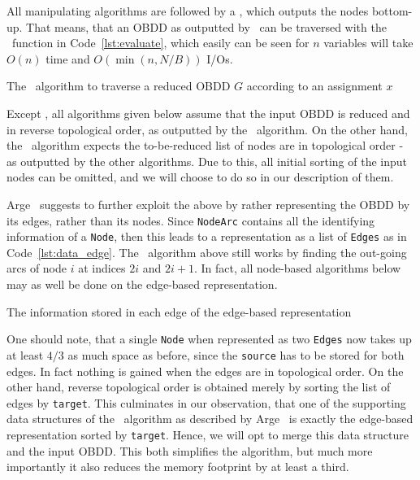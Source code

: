 All manipulating algorithms are followed by a \Reduce, which outputs the nodes
bottom-up. That means, that an OBDD as outputted by \Reduce\ can be traversed
with the \Evaluate\ function in Code~\ref{lst:evaluate}, which easily can be
seen for $n$ variables will take $O(n)$ time and $O(\min(n, N/B))$ I/Os.
\begin{lstfloat}[ht!]
  \centering

  

  \caption{The \Evaluate\ algorithm to traverse a reduced OBDD $G$ according to an
    assignment $x$}
  \label{lst:evaluate}
\end{lstfloat}

Except \Reduce, all algorithms given below assume that the input OBDD is reduced
and in reverse topological order, as outputted by the \Reduce\ algorithm. On the
other hand, the \Reduce\ algorithm expects the to-be-reduced list of nodes are
in topological order - as outputted by the other algorithms. Due to this, all
initial sorting of the input nodes can be omitted, and we will choose to do so
in our description of them. \cite{Arge96}

Arge~\cite{Arge96} suggests to further exploit the above by rather representing
the OBDD by its edges, rather than its nodes. Since \lstinline{NodeArc} contains
all the identifying information of a \lstinline{Node}, then this leads to a
representation as a list of \lstinline{Edges} as in Code~\ref{lst:data_edge}.
The \Evaluate\ algorithm above still works by finding the out-going arcs of node
$i$ at indices $2i$ and $2i+1$. In fact, all node-based algorithms below may as
well be done on the edge-based representation.

\begin{lstfloat}[ht!]
  \centering

  

  \caption{The information stored in each edge of the edge-based representation}
  \label{lst:data_edge}
\end{lstfloat}

One should note, that a single \lstinline{Node} when represented as two
\lstinline{Edges} now takes up at least $4/3$ as much space as before, since the
\lstinline{source} has to be stored for both edges. In fact nothing is gained
when the edges are in topological order. On the other hand, reverse topological
order is obtained merely by sorting the list of edges by \lstinline{target}.
This culminates in our observation, that one of the supporting data structures
of the \Reduce\ algorithm as described by Arge~\cite{Arge96} is exactly the
edge-based representation sorted by \lstinline{target}. Hence, we will opt to
merge this data structure and the input OBDD. This both simplifies the
algorithm, but much more importantly it also reduces the memory footprint by at
least a third.

